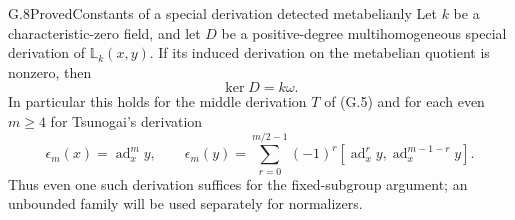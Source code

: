 \begin{statement}{G.8}{Proved}{Constants of a special derivation detected metabelianly}
Let $k$ be a characteristic-zero field, and let $D$ be a positive-degree
multihomogeneous special derivation of $\mathbb L_k(x,y)$.
If its induced derivation on the metabelian quotient is nonzero, then
\[
                         \ker D=k\omega.                \tag{G.10}
\]
In particular this holds for the middle derivation $T$ of (G.5) and
for each even $m\ge4$ for Tsunogai's derivation
\[
 \epsilon_m(x)=\operatorname{ad}_x^m y,\qquad
 \epsilon_m(y)=\sum_{r=0}^{m/2-1}(-1)^r
    [\operatorname{ad}_x^r y,\operatorname{ad}_x^{m-1-r}y].
 \tag{G.9}
\]
Thus even one such derivation suffices for the fixed-subgroup
argument; an unbounded family will be used separately for normalizers.
\end{statement}
